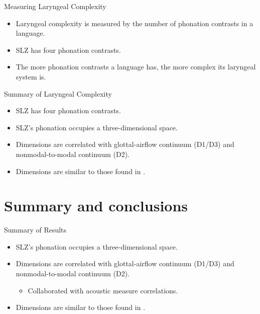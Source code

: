 \documentclass{beamer}
\begin{document}
\begin{frame}{Measuring Laryngeal Complexity}
  \begin{itemize}
    \item Laryngeal complexity is measured by the number of phonation contrasts in a language.
    \item SLZ has four phonation contrasts.
    \item The more phonation contrasts a language has, the more complex its laryngeal system is.
  \end{itemize}
\end{frame}

\begin{frame}{Summary of Laryngeal Complexity}
  \begin{itemize}
    \item SLZ has four phonation contrasts.
    \item SLZ's phonation occupies a three-dimensional space.
    \item Dimensions are correlated with glottal-airflow continuum (D1/D3) and nonmodal-to-modal continuum (D2).
    \item Dimensions are similar to those found in \citet{keatingCrosslanguageAcousticSpace2023}.
  \end{itemize}
\end{frame}

\section{Summary and conclusions}
\begin{frame}{Summary of Results}
  \begin{itemize}
    \item SLZ's phonation occupies a three-dimensional space.
    \item Dimensions are correlated with glottal-airflow continuum (D1/D3) and nonmodal-to-modal continuum (D2).
    \begin{itemize}
      \item Collaborated with acoustic measure correlations.
    \end{itemize}
    \item Dimensions are similar to those found in \citeauthor{keatingCrosslanguageAcousticSpace2023}.
  \end{itemize}
\end{frame}
\end{document}
